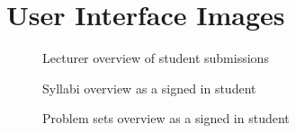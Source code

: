 \chapter{User Interface Images} \label{chap:images}
\begin{figure}[H]
    \centering
    \caption{Lecturer overview of student submissions}
    \label{fig:teacher_overview.}
\end{figure}

\begin{figure}[H]
    \centering
    \caption{Syllabi overview as a signed in student}
    \label{fig:syllabi}
\end{figure}

\begin{figure}[H]
    \centering
    \caption{Problem sets overview as a signed in student}
    \label{fig:problemsets}
\end{figure}